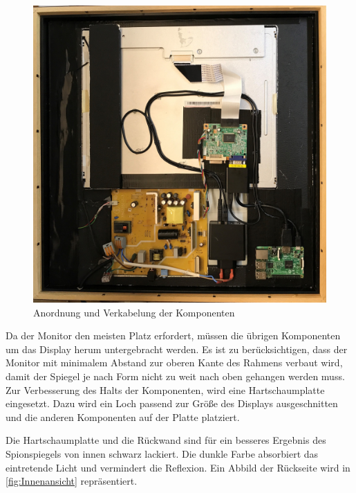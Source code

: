 \begin{figure}
	\includegraphics[scale=0.06]{bilder/Innenansicht.jpg}
	\caption{Anordnung und Verkabelung der Komponenten}
	\label{fig:Innenansicht}
\end{figure}
Da der Monitor den meisten Platz erfordert, müssen die übrigen Komponenten um das Display herum untergebracht werden. 
Es ist zu berücksichtigen, dass der Monitor mit  minimalem Abstand zur oberen Kante des Rahmens verbaut wird, damit der Spiegel je nach Form nicht zu weit nach oben gehangen werden muss. 
Zur Verbesserung des Halts der Komponenten, wird eine Hartschaumplatte eingesetzt. 
Dazu wird ein Loch passend zur Größe des Displays ausgeschnitten und die anderen Komponenten auf der Platte platziert. 

Die Hartschaumplatte und die Rückwand sind für ein besseres Ergebnis des Spionspiegels von innen schwarz lackiert. 
Die dunkle Farbe absorbiert das eintretende Licht und vermindert die Reflexion.\cite{welsch2012einfuhrung} Ein Abbild der Rückseite wird in \autoref{fig:Innenansicht} repräsentiert.

